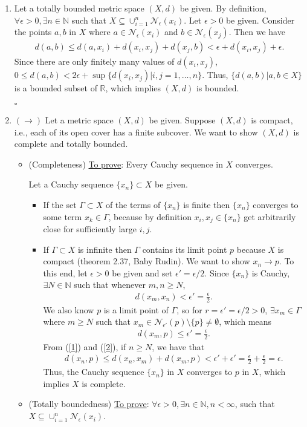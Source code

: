 \documentclass[11pt]{article}
\begin{document}
\begin{enumerate}
	\item Let a totally bounded metric space $(X,d)$ be given. By definition, $\forall \epsilon > 0, \exists n\in \mathbb{N}$ such that $X \subseteq \cup^n_{i=1}\mathcal{N}_\epsilon(x_i)$. Let $\epsilon > 0$ be given. Consider the points $a,b$ in $X$ where $a\in \mathcal{N}_\epsilon(x_i)$ and $b \in \mathcal{N}_\epsilon(x_j)$. Then we have
	\begin{align*}
	d(a,b) \leq d(a,x_i) + d(x_i,x_j) + d(x_j,b) < \epsilon + d(x_i,x_j) + \epsilon.
	\end{align*}
	Since there are only finitely many values of $d(x_i,x_j)$, $0 \leq d(a,b) < 2\epsilon + \sup\{ d(x_i,x_j)| i,j = 1,\dots,n \}$. Thus, $\{d(a,b)| a,b \in X\}$ is a bounded subset of $\mathbb{R}$, which implies $(X,d)$ is bounded.
	
	\hfill $\square$
	\item  $(\rightarrow)$ Let a metric space $(X,d)$ be given. Suppose $(X,d)$ is compact, i.e., each of its open cover has a finite subcover. We want to show $(X,d)$ is complete and totally bounded. 
	\begin{itemize}
		\item (Completeness) \underline{To prove}: Every Cauchy sequence in $X$ converges. 
		
		Let a Cauchy sequence $\{x_n\} \subset X$ be given. 
		\begin{itemize}
			\item If the set $\Gamma \subset X$ of the terms of $\{x_n\}$ is finite then $\{x_n\}$ converges to some term $x_k\in\Gamma$, because by definition $x_i,x_j \in \{x_n\}$ get arbitrarily close for sufficiently large $i,j$. 
			\item If $\Gamma \subset X$ is infinite then $\Gamma$ contains its limit point $p$ because $X$ is compact (theorem 2.37, Baby Rudin). We want to show $x_n \to p$. To this end, let $\epsilon > 0$ be given and set $\epsilon' = \epsilon/2$. Since $\{x_n\}$ is Cauchy, $\exists N \in \mathbb{N}$ such that whenever $m,n \geq N$, 
			\begin{align}\label{1}
			d(x_m,x_n) < \epsilon' = \frac{\epsilon}{2}.
			\end{align}
			We also know $p$ is a limit point of $\Gamma$, so for $r = \epsilon' = \epsilon/2 > 0$, $\exists x_m \in \Gamma$ where $m \geq N$ such that $x_m \in \mathcal{N}_{\epsilon'}(p)\setminus\{p\} \neq \emptyset$, which means
			\begin{align}\label{2}
			d(x_m,p) \leq \epsilon' = \frac{\epsilon}{2}.
			\end{align}
			From (\ref{1}) and (\ref{2}), if $n \geq N$, we have that
			\begin{align*}
			d(x_n,p) \leq d(x_n,x_m) + d(x_m,p) < \epsilon' + \epsilon' = \frac{\epsilon}{2} + \frac{\epsilon}{2} = \epsilon.
			\end{align*}
			Thus, the Cauchy sequence $\{x_n\}$ in $X$ converges to $p$ in $X$, which implies $X$ is complete.  
		\end{itemize}
		\item (Totally boundedness) \underline{To prove}: $\forall \epsilon > 0, \exists n \in \mathbb{N}, n < \infty$, such that $X \subseteq \cup^{n}_{i=1}\mathcal{N}_\epsilon(x_i)$.  
		

\end{itemize}
\end{enumerate}
\end{document}
